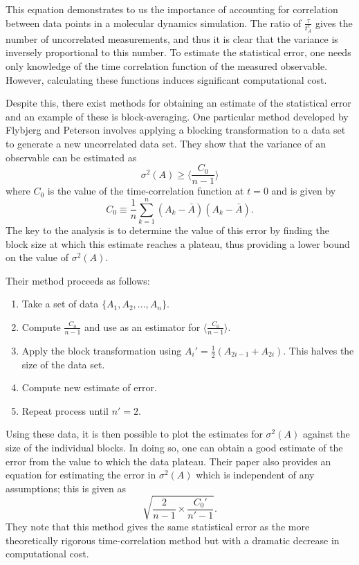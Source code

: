 This equation demonstrates to us the importance of accounting for correlation between data points in a molecular dynamics simulation. 
The ratio of $\frac{\tau}{t_{A}^{c}}$ gives the number of uncorrelated measurements, and thus it is clear that the variance is inversely proportional to this number.
To estimate the statistical error, one needs only knowledge of the time correlation function of the measured observable.
However, calculating these functions induces significant computational cost.

Despite this, there exist methods for obtaining an estimate of the statistical error and an example of these is block-averaging.
One particular method developed by Flybjerg and Peterson involves applying a blocking transformation to a data set to generate a new uncorrelated data set\cite{Flyvbjerg1989}.
They show that the variance of an observable can be estimated as
$$\sigma^{2}(A) \geq \bigg \langle \frac{C_{0}}{n-1} \bigg \rangle$$
where $C_{0}$ is the value of the time-correlation function at $t=0$ and is given by
$$C_{0} \equiv \frac{1}{n} \sum_{k=1}^{n}(A_{k} - \bar{A})(A_{k} - \bar{A}).$$
The key to the analysis is to determine the value of this error by finding the block size at which this estimate reaches a plateau, thus providing a lower bound on the value of $\sigma^{2}(A)$. 

Their method proceeds as follows:
\begin{enumerate}
 \item Take a set of data $\{A_{1},A_{2},...,A_{n}\}$.
 \item Compute $\frac{C_{0}}{n-1}$ and use as an estimator for $\big \langle \frac{C_{0}}{n-1} \big \rangle$.
 \item Apply the block transformation using
	$A_{i}' = \frac{1}{2} (A_{2i-1} + A_{2i}).$
	This halves the size of the data set.
 \item Compute new estimate of error.
 \item Repeat process until $n' = 2$.
\end{enumerate}

Using these data, it is then possible to plot the estimates for $\sigma^{2}(A)$ against the size of the individual blocks.
In doing so, one can obtain a good estimate of the error from the value to which the data plateau.
Their paper also provides an equation for estimating the error in $\sigma^{2}(A)$ which is independent of any assumptions; this is given as
$$\sqrt{\frac{2}{n-1} \times \frac{C_{0}'}{n'-1}}.$$
They note that this method gives the same statistical error as the more theoretically rigorous time-correlation method but with a dramatic decrease in computational cost.

